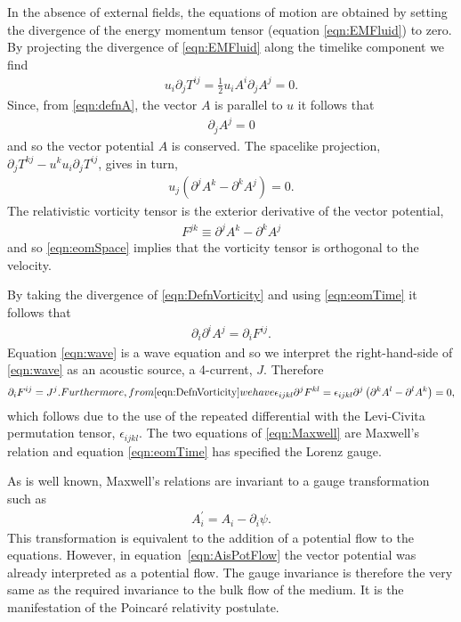 \documentclass[10pt, fleqn,final,showtrims,oldfontcommands, article,a4paper,oneside]{memoir} %
\newcommand{\sub}[1]{\begin{subequations}#1\end{subequations}}
\newcommand{\eqa}[1]{\begin{align}#1\end{align}}
\newcommand{\eqal}[2]{\begin{align}#1\label{eqn:#2}\end{align}}
\newcommand{\eqnref}[1]{\ref{eqn:#1}}
\newcommand{\lr}[1]{\left( #1 \right)}
\renewcommand{\d}{\partial}
\newcommand{\del}{\nabla}
\newcommand{\scope}[1]{\tilde{#1}}
\newcommand{\half}{\tfrac{1}{2}}
\newcommand{\Poincare}{Poincar{\'e}\xspace}
\begin{document}
In the absence of external fields, the equations of motion are obtained by setting the 
 divergence of the energy momentum tensor (equation \eqnref{EMFluid}) to zero.
By projecting the divergence of \eqnref{EMFluid} along the timelike component we find
\eqa{
  u_i \d_j T^{i j} = \half u_i A^i \d_j A^j = 0.
}
Since, from \eqnref{defnA}, the vector $A$ is parallel to $u$  it follows that 
\eqal{
  \d_j A^j = 0
}{eomTime}
and so the vector potential $A$ is conserved.
The spacelike projection,
$\d_j T^{k j} - u^k u_i \d_j T^{i j}$, gives in turn,
\eqal{
u_j \lr{\d^j A^k - \d^k A^j} = 0.
}{eomSpace}
The relativistic vorticity tensor is the exterior derivative  of the vector potential, 
\eqal{
F^{j k} \equiv \d^j A^k - \d^k A^j
}{DefnVorticity}
and so \eqnref{eomSpace} implies that the vorticity tensor is orthogonal to the velocity.

By taking the divergence of \eqnref{DefnVorticity} and using \eqnref{eomTime} it follows that 
\eqal{
  \d_i \d^i A^j = \d_i F^{i j}.
}{wave}
Equation \eqnref{wave} is a wave equation and so we interpret the right-hand-side of \eqnref{wave} as an acoustic source,
a 4-current, $J$.
Therefore 
\sub{
\label{eqn:Maxwell}
\eqa{
  \d_i F^{i j} = J^j.
}
Furthermore, from \eqnref{DefnVorticity} we have
\begin{align}
  \epsilon_{i j k l} \d^j F^{k l} = \epsilon_{i j k l} \d^j \lr{\d^k A^l - \d^l A^k} = 0,
\end{align}
}
which follows due to the use of the repeated differential with the Levi-Civita permutation tensor, $\epsilon_{i j k l}$.
The two equations of \eqnref{Maxwell} are Maxwell's relation and equation \eqnref{eomTime} has specified the Lorenz gauge.

As is well known, Maxwell's relations are invariant to a gauge transformation such as
\begin{align}
  A_i^\prime = A_i - \d_i \psi.
\end{align}
This transformation is equivalent to the addition of a potential flow to the equations.
However, in equation~\eqnref{AisPotFlow} the vector potential was already interpreted as a potential flow.
The gauge invariance is therefore the very same as the required invariance to the bulk flow of the medium.
It is the manifestation of the \Poincare relativity postulate.
\end{document}
